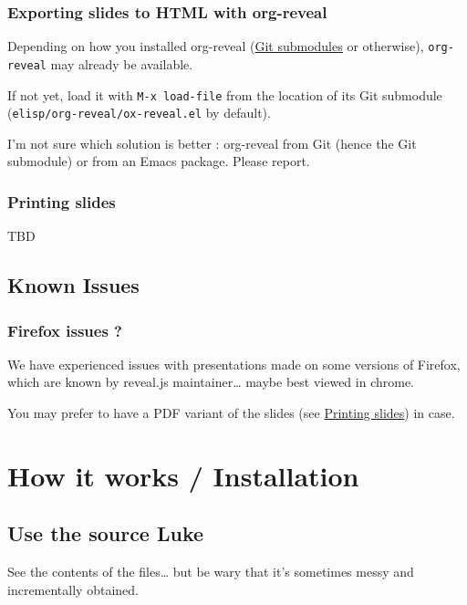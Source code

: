 \documentclass[a4paper]{article}
\begin{document}
\subsubsection{Exporting slides to HTML with org-reveal}
\label{sec:org7f817f4}

Depending on how you installed org-reveal (\hyperref[sec:org63fbe85]{Git submodules} or otherwise), \texttt{org-reveal} may already be available.

If not yet, load it with \texttt{M-x load-file} from the location of its Git submodule (\texttt{elisp/org-reveal/ox-reveal.el} by default).

\begin{NOTES}
I'm not sure which solution is better : org-reveal from Git (hence the Git submodule) or from an Emacs package. Please report.
\end{NOTES}

\subsubsection{Printing slides}
\label{sec:org6d24b33}

TBD

\subsection{Known Issues}
\label{sec:org777cc39}

\subsubsection{Firefox issues ?}
\label{sec:orgdbf2b3a}

We have experienced issues with presentations made on some versions of Firefox, which are known by reveal.js maintainer\ldots{} maybe best viewed in chrome.

You may prefer to have a PDF variant of the slides (see \hyperref[sec:org6d24b33]{Printing slides}) in case.



\section{How it works / Installation}
\label{sec:orgcc1cf8a}
\subsection{Use the source Luke}
\label{sec:org6264da9}

See the contents of the files\ldots{} but be wary that it's sometimes messy and incrementally obtained.
\end{document}
